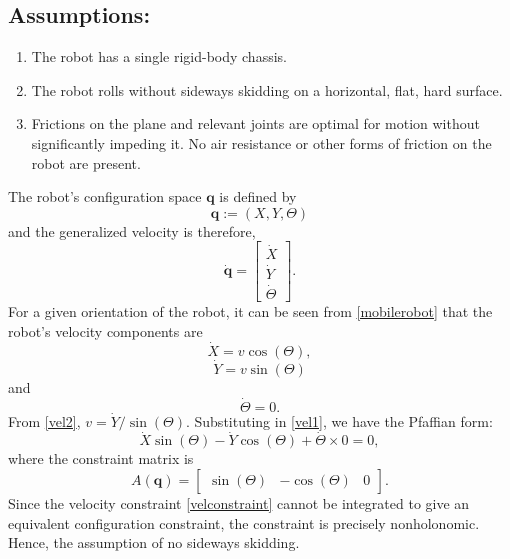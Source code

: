 \documentclass[final,5p,times,twocolumn]{elsarticle}
\begin{document}
\subsection*{Assumptions:}
\begin{enumerate}
	\item The robot has a single rigid-body chassis.
	\item The robot rolls without sideways skidding on a horizontal, flat, hard surface.
	\item Frictions on the plane and relevant joints are optimal for motion without significantly impeding it. No air resistance or other forms of friction on the robot are present. 
\end{enumerate}
The robot's configuration space $\bm{q}$ is defined by
\begin{equation}
\bm{q} := (X,Y,\Theta)
\end{equation}
and the generalized velocity is therefore,
\begin{equation}
\dot{\bm{q}} = \left[\begin{array}{c}
\dot{X}\\ \dot{Y}\\ \dot{\Theta}
\end{array}\right].
\end{equation}
For a given orientation of the robot, it can be seen from \cref{mobilerobot} that the robot's velocity components are
\begin{equation}
\dot{X} = v\cos(\Theta)\label{vel1},
\end{equation} 
\begin{equation}
\dot{Y} = v\sin(\Theta)\label{vel2}
\end{equation}
and 
\begin{equation}
\dot{\Theta} = 0.
\end{equation}
From \eqref{vel2}, $v = \dot{Y}/\sin(\Theta)$. Substituting in \eqref{vel1}, we have the Pfaffian form:
\begin{equation}
\dot{X}\sin(\Theta)-\dot{Y}\cos(\Theta)+\dot{\Theta}\times0 = 0\label{velconstraint},
\end{equation}
where the constraint matrix is
\begin{equation}
A(\bm{q}) = \left[\begin{array}{ccc}
\sin(\Theta)&-\cos(\Theta)&0
\end{array}\right].
\end{equation}
Since the velocity constraint \eqref{velconstraint} cannot be integrated to give an equivalent configuration constraint, the constraint is precisely nonholonomic. Hence, the assumption of no sideways skidding.
\end{document}
